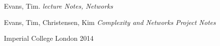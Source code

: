 \documentclass[twoside]{article}
\begin{document}
\clearpage
\begin{thebibliography}{99} %

\newblock Evans, Tim. 
\emph{lecture Notes, Networks}

\newblock Evans, Tim, Christensen, Kim 
\emph{Complexity and Networks Project Notes}

\newblock
Imperial College London 2014
 
\end{thebibliography}

\end{document}
